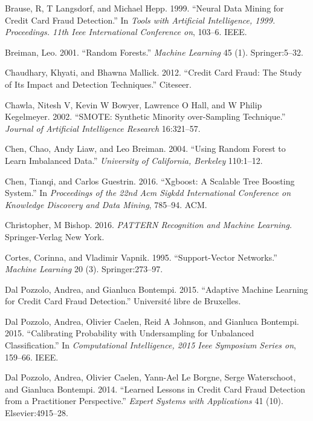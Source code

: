 \documentclass[12pt,]{article}
\begin{document}
\leavevmode\hypertarget{ref-brause1999neural}{}%
Brause, R, T Langsdorf, and Michael Hepp. 1999. ``Neural Data Mining for
Credit Card Fraud Detection.'' In \emph{Tools with Artificial
Intelligence, 1999. Proceedings. 11th Ieee International Conference on},
103--6. IEEE.

\leavevmode\hypertarget{ref-breiman2001random}{}%
Breiman, Leo. 2001. ``Random Forests.'' \emph{Machine Learning} 45 (1).
Springer:5--32.

\leavevmode\hypertarget{ref-chaudhary2012credit}{}%
Chaudhary, Khyati, and Bhawna Mallick. 2012. ``Credit Card Fraud: The
Study of Its Impact and Detection Techniques.'' Citeseer.

\leavevmode\hypertarget{ref-chawla2002smote}{}%
Chawla, Nitesh V, Kevin W Bowyer, Lawrence O Hall, and W Philip
Kegelmeyer. 2002. ``SMOTE: Synthetic Minority over-Sampling Technique.''
\emph{Journal of Artificial Intelligence Research} 16:321--57.

\leavevmode\hypertarget{ref-chen2004using}{}%
Chen, Chao, Andy Liaw, and Leo Breiman. 2004. ``Using Random Forest to
Learn Imbalanced Data.'' \emph{University of California, Berkeley}
110:1--12.

\leavevmode\hypertarget{ref-chen2016xgboost}{}%
Chen, Tianqi, and Carlos Guestrin. 2016. ``Xgboost: A Scalable Tree
Boosting System.'' In \emph{Proceedings of the 22nd Acm Sigkdd
International Conference on Knowledge Discovery and Data Mining},
785--94. ACM.

\leavevmode\hypertarget{ref-christopher2016pattern}{}%
Christopher, M Bishop. 2016. \emph{PATTERN Recognition and Machine
Learning.} Springer-Verlag New York.

\leavevmode\hypertarget{ref-cortes1995support}{}%
Cortes, Corinna, and Vladimir Vapnik. 1995. ``Support-Vector Networks.''
\emph{Machine Learning} 20 (3). Springer:273--97.

\leavevmode\hypertarget{ref-dal2015adaptive}{}%
Dal Pozzolo, Andrea, and Gianluca Bontempi. 2015. ``Adaptive Machine
Learning for Credit Card Fraud Detection.'' Université libre de
Bruxelles.

\leavevmode\hypertarget{ref-dal2015calibrating}{}%
Dal Pozzolo, Andrea, Olivier Caelen, Reid A Johnson, and Gianluca
Bontempi. 2015. ``Calibrating Probability with Undersampling for
Unbalanced Classification.'' In \emph{Computational Intelligence, 2015
Ieee Symposium Series on}, 159--66. IEEE.

\leavevmode\hypertarget{ref-dal2014learned}{}%
Dal Pozzolo, Andrea, Olivier Caelen, Yann-Ael Le Borgne, Serge
Waterschoot, and Gianluca Bontempi. 2014. ``Learned Lessons in Credit
Card Fraud Detection from a Practitioner Perspective.'' \emph{Expert
Systems with Applications} 41 (10). Elsevier:4915--28.
\end{document}
